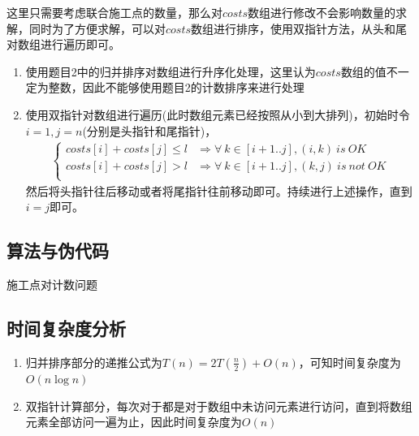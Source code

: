 \documentclass{article}
\begin{document}
这里只需要考虑联合施工点的数量，那么对$costs$数组进行修改不会影响数量的求解，同时为了方便求解，可以对$costs$数组进行排序，使用双指针方法，从头和尾对数组进行遍历即可。

\begin{enumerate}
    \item 使用题目2中的归并排序对数组进行升序化处理，这里认为$costs$数组的值不一定为整数，因此不能够使用题目2的计数排序来进行处理
    \item 使用双指针对数组进行遍历(此时数组元素已经按照从小到大排列)，初始时令$i=1, j = n$(分别是头指针和尾指针)，
    \begin{align*}
    \begin{cases}
        costs[i] + costs[j] \le l &\Rightarrow \forall\ k\in [i+1..j], (i,k)\ is\ OK\\ 
        costs[i] + costs[j] > l &\Rightarrow \forall \ k\in [i+1..j], (k,j)\ is\ not\ OK\\ 
    \end{cases}
\end{align*}
然后将头指针往后移动或者将尾指针往前移动即可。持续进行上述操作，直到$i=j$即可。
\end{enumerate}


\subsection{算法与伪代码}

\begin{algorithm}[H]
\caption{施工点对计数问题}
\LinesNumbered
{}
\end{algorithm}
\subsection{时间复杂度分析}

\begin{enumerate}
    \item 归并排序部分的递推公式为$T(n) = 2T(\frac{n}{2}) + O(n)$，可知时间复杂度为$O(n\log n)$
    \item 双指针计算部分，每次对于都是对于数组中未访问元素进行访问，直到将数组元素全部访问一遍为止，因此时间复杂度为$O(n)$
\end{enumerate}
\end{document}

